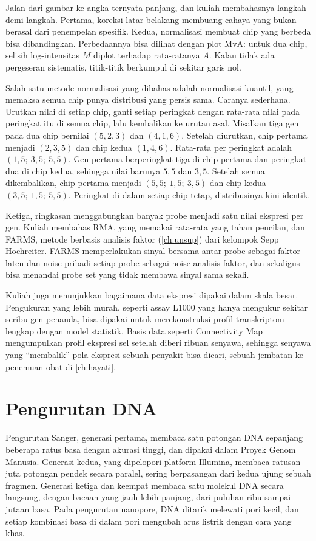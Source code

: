 Jalan dari gambar ke angka ternyata panjang, dan kuliah membahasnya langkah demi langkah. Pertama, koreksi latar
belakang membuang cahaya yang bukan berasal dari penempelan spesifik. Kedua, normalisasi membuat chip yang berbeda bisa
dibandingkan. Perbedaannya bisa dilihat dengan plot MvA: untuk dua chip, selisih log-intensitas $M$ diplot terhadap
rata-ratanya $A$. Kalau tidak ada pergeseran sistematis, titik-titik berkumpul di sekitar garis nol.

Salah satu metode normalisasi yang dibahas adalah normalisasi kuantil, yang memaksa semua chip punya distribusi yang
persis sama. Caranya sederhana. Urutkan nilai di setiap chip, ganti setiap peringkat dengan rata-rata nilai pada
peringkat itu di semua chip, lalu kembalikan ke urutan asal. Misalkan tiga gen pada dua chip bernilai $(5,2,3)$ dan
$(4,1,6)$. Setelah diurutkan, chip pertama menjadi $(2,3,5)$ dan chip kedua $(1,4,6)$. Rata-rata per peringkat adalah
$(1{,}5;\ 3{,}5;\ 5{,}5)$. Gen pertama berperingkat tiga di chip pertama dan peringkat dua di chip kedua, sehingga nilai
barunya $5{,}5$ dan $3{,}5$. Setelah semua dikembalikan, chip pertama menjadi $(5{,}5;\ 1{,}5;\ 3{,}5)$ dan chip kedua
$(3{,}5;\ 1{,}5;\ 5{,}5)$. Peringkat di dalam setiap chip tetap, distribusinya kini identik.

Ketiga, ringkasan menggabungkan banyak probe menjadi satu nilai ekspresi per gen. Kuliah membahas RMA, yang memakai
rata-rata yang tahan pencilan, dan FARMS, metode berbasis analisis faktor (\cref{ch:unsup}) dari kelompok Sepp
Hochreiter. FARMS memperlakukan sinyal bersama antar probe sebagai faktor laten dan noise pribadi setiap probe sebagai
noise analisis faktor, dan sekaligus bisa menandai probe set yang tidak membawa sinyal sama sekali.

Kuliah juga menunjukkan bagaimana data ekspresi dipakai dalam skala besar. Pengukuran yang lebih murah, seperti assay
L1000 yang hanya mengukur sekitar seribu gen penanda, bisa dipakai untuk merekonstruksi profil transkriptom lengkap
dengan model statistik. Basis data seperti Connectivity Map mengumpulkan profil ekspresi sel setelah diberi ribuan
senyawa, sehingga senyawa yang ``membalik'' pola ekspresi sebuah penyakit bisa dicari, sebuah jembatan ke penemuan
obat di \cref{ch:hayati}.

\section{Pengurutan DNA}

Pengurutan Sanger, generasi pertama, membaca satu potongan DNA sepanjang beberapa ratus basa dengan akurasi tinggi, dan
dipakai dalam Proyek Genom Manusia. Generasi kedua, yang dipelopori platform Illumina, membaca ratusan juta potongan
pendek secara paralel, sering berpasangan dari kedua ujung sebuah fragmen. Generasi ketiga dan keempat membaca satu
molekul DNA secara langsung, dengan bacaan yang jauh lebih panjang, dari puluhan ribu sampai jutaan basa. Pada
pengurutan nanopore, DNA ditarik melewati pori kecil, dan setiap kombinasi basa di dalam pori mengubah arus listrik
dengan cara yang khas.

